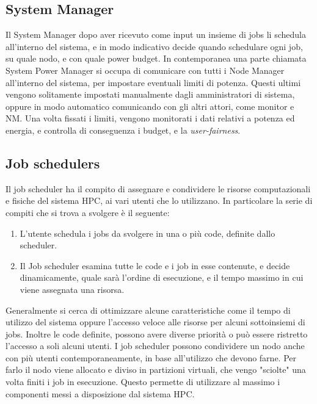 \subsection{System Manager}
Il System Manager dopo aver ricevuto come input un insieme di jobs li schedula all'interno del sistema, e in modo indicativo decide quando schedulare ogni job, su quale nodo, e con quale power budget. In contemporanea una parte chiamata System Power Manager %
si occupa di comunicare con tutti i Node Manager all'interno del sistema, per impostare eventuali limiti di potenza. Questi ultimi vengono solitamente impostati manualmente dagli amministratori di sistema, oppure in modo automatico comunicando con gli altri attori, come monitor e NM. Una volta fissati i limiti, vengono monitorati i dati relativi a potenza ed energia, e controlla di conseguenza i budget, e la \emph{user-fairness}.

\subsection{Job schedulers}
Il job scheduler ha il compito di assegnare e condividere le risorse computazionali e fisiche del sistema HPC, ai vari utenti che lo utilizzano. In particolare la serie di compiti che si trova a svolgere è il seguente:
\begin{enumerate}
    \item L'utente schedula i jobs da svolgere in una o più code, definite dallo scheduler.
    \item Il Job scheduler esamina tutte le code e i job in esse contenute, e decide dinamicamente, quale sarà l'ordine di esecuzione, e il tempo massimo in cui viene assegnata una risorsa.
\end{enumerate}
Generalmente si cerca di ottimizzare alcune caratteristiche come il tempo di utilizzo del sistema oppure l'accesso veloce alle risorse per alcuni sottoinsiemi di jobs. Inoltre le code definite, possono avere diverse priorità o può essere ristretto l'accesso a soli alcuni utenti. I job scheduler possono condividere un nodo anche con più utenti contemporaneamente, in base all'utilizzo che devono farne. Per farlo il nodo viene allocato e diviso in partizioni virtuali, che vengo "sciolte" una volta finiti i job in esecuzione. Questo permette di utilizzare al massimo i componenti messi a disposizione dal sistema HPC.

